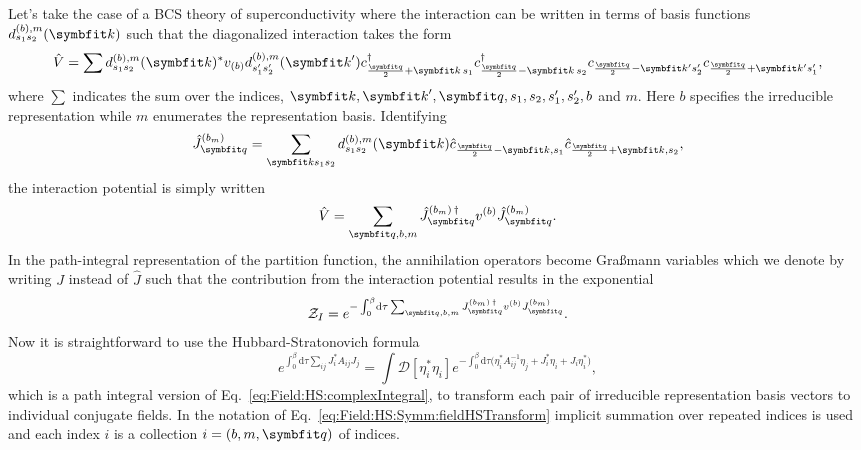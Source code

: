 Let's take the case of a BCS theory of superconductivity where the interaction can be written in terms of
basis functions $d^{(b),m}_{s_1s_2}(\v{k})$ such that the diagonalized interaction takes the form
\begin{equation}
    \label{eq:Field:HS:Symm:diagonalizedV}
    \hat{V} = \sum d^{(b),m}_{s_1s_2}(\v{k})^\ast v_{(b)}d^{(b),m}_{s_1's_2'}(\v{k}') c_{\frac{\v{q}}{2}+\v{k}\,s_1}^\dagger c_{\frac{\v{q}}{2}-\v{k}\,s_2}^\dagger c_{\frac{\v{q}}{2}-\v{k}'s_2'}c_{\frac{\v{q}}{2}+\v{k}'s_1'},
\end{equation}
where $\sum$ indicates the sum over the indices, $\v{k}, \v{k}', \v{q}, s_1, s_2, s_1', s_2', b$ and $m$. Here $b$ specifies the irreducible representation
while $m$ enumerates the representation basis.
Identifying
\begin{equation}
    \label{eq:Field:HS:Symm:identification}
    \hat{J}_\v{q}^{(b_m)} = \sum_{\v{k}s_1s_2}d^{(b),m}_{s_1s_2}(\v{k})\hat{c}_{\frac{\v{q}}{2}-\v{k},s_1}\hat{c}_{\frac{\v{q}}{2}+\v{k},s_2},
\end{equation}
the interaction potential is simply written
\begin{equation}
    \label{eq:Field:HS:Symm:HSpreparedV}
    \hat{V} = \sum_{\v{q},b,m}\hat{J}_\v{q}^{(b_m)\,\dagger}v^{(b)}\hat{J}_\v{q}^{(b_m)}.
\end{equation}
In the path-integral representation of the partition function, the annihilation operators become Gra\ss mann variables which we denote
by writing $J$ instead of $\hat{J}$ such that the contribution from the interaction potential results in the exponential
\begin{equation}
    \label{eq:Field:HS:Symm:potentialExp}
    \mathcal{Z}_I = e^{-\int_0^\beta\!\mathrm{d}\tau\sum_{\v{q},b,m}J_\v{q}^{(b_m)\,\dagger}v^{(b)}J_\v{q}^{(b_m)}}.
\end{equation}
Now it is straightforward to use the Hubbard-Stratonovich formula
\begin{equation}
    \label{eq:Field:HS:Symm:fieldHSTransform}
    e^{\int_0^\beta\!\mathrm{d}\tau\sum_{ij} J_i^\ast A_{ij}J_{j}} = \int\!\mathcal{D}[\eta_i^\ast\eta_i]e^{-\int_0^\beta\!\mathrm{d}\tau\big(\eta_i^\ast A^{-1}_{ij}\eta_j + J_i^\ast\eta_i+J_i\eta_i^\ast\big)},
\end{equation}
which is a path integral version of Eq.~\eqref{eq:Field:HS:complexIntegral}, to transform each pair of irreducible representation basis vectors to
individual conjugate fields. In the notation of Eq.~\eqref{eq:Field:HS:Symm:fieldHSTransform} implicit summation over repeated indices is used and each index $i$ is a collection $i = (b,m,\v{q})$ of indices.
